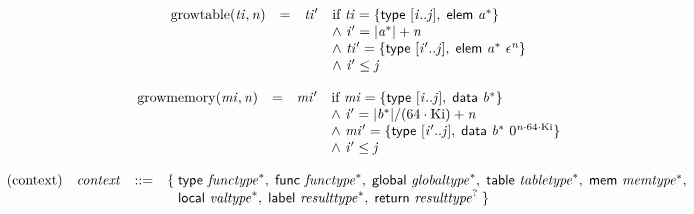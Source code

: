 \vspace{1ex}

$$
\begin{array}{@{}lcl@{}l@{}}
{\mathrm{growtable}}({\mathit{ti}}, {\mathit{n}}) &=& {\mathit{ti}'} &\quad
  \mbox{if}~{\mathit{ti}} = \{ \begin{array}[t]{@{}l@{}}
\mathsf{type}~[{\mathit{i}} .. {\mathit{j}}],\; \mathsf{elem}~{{\mathit{a}}^\ast} \}\end{array} \\
 &&&\quad {\land}~{\mathit{i}'} = {|{{\mathit{a}}^\ast}|} + {\mathit{n}} \\
 &&&\quad {\land}~{\mathit{ti}'} = \{ \begin{array}[t]{@{}l@{}}
\mathsf{type}~[{\mathit{i}'} .. {\mathit{j}}],\; \mathsf{elem}~{{\mathit{a}}^\ast}~{\epsilon^{{\mathit{n}}}} \}\end{array} \\
 &&&\quad {\land}~{\mathit{i}'} \leq {\mathit{j}} \\
\end{array}
$$

$$
\begin{array}{@{}lcl@{}l@{}}
{\mathrm{growmemory}}({\mathit{mi}}, {\mathit{n}}) &=& {\mathit{mi}'} &\quad
  \mbox{if}~{\mathit{mi}} = \{ \begin{array}[t]{@{}l@{}}
\mathsf{type}~[{\mathit{i}} .. {\mathit{j}}],\; \mathsf{data}~{{\mathit{b}}^\ast} \}\end{array} \\
 &&&\quad {\land}~{\mathit{i}'} = {|{{\mathit{b}}^\ast}|} / (64 \cdot {\mathrm{Ki}}) + {\mathit{n}} \\
 &&&\quad {\land}~{\mathit{mi}'} = \{ \begin{array}[t]{@{}l@{}}
\mathsf{type}~[{\mathit{i}'} .. {\mathit{j}}],\; \mathsf{data}~{{\mathit{b}}^\ast}~{0^{{\mathit{n}} \cdot 64 \cdot {\mathrm{Ki}}}} \}\end{array} \\
 &&&\quad {\land}~{\mathit{i}'} \leq {\mathit{j}} \\
\end{array}
$$

$$
\begin{array}{@{}lrrl@{}l@{}}
\mbox{(context)} & {\mathit{context}} &::=& \{\; \begin{array}[t]{@{}l@{}l@{}}
\mathsf{type}~{{\mathit{functype}}^\ast},\; \mathsf{func}~{{\mathit{functype}}^\ast},\; \mathsf{global}~{{\mathit{globaltype}}^\ast},\; \mathsf{table}~{{\mathit{tabletype}}^\ast},\; \mathsf{mem}~{{\mathit{memtype}}^\ast},\; \\
  \mathsf{local}~{{\mathit{valtype}}^\ast},\; \mathsf{label}~{{\mathit{resulttype}}^\ast},\; \mathsf{return}~{{\mathit{resulttype}}^?} \;\}\end{array} \\
\end{array}
$$


